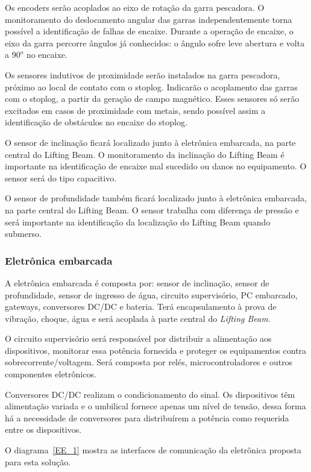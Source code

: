 Os encoders serão acoplados ao eixo de rotação da garra pescadora. O
monitoramento do deslocamento angular das garras independentemente torna
possível a identificação de falhas de encaixe. Durante a operação de encaixe, o
eixo da garra percorre ângulos já conhecidos: o ângulo sofre leve abertura e
volta a $90^o$ no encaixe. 

Os sensores indutivos de proximidade serão instalados na garra pescadora,
próximo ao local de contato com o stoplog. Indicarão o acoplamento das garras
com o stoplog, a partir da geração de campo magnético. Esses sensores só serão
excitados em casos de proximidade com metais, sendo possível assim a
identificação de obstáculos no encaixe do stoplog. 

O sensor de inclinação ficará localizado junto à eletrônica embarcada, na parte
central do Lifting Beam. O monitoramento da inclinação do Lifting Beam é
importante na identificação de encaixe mal sucedido ou danos no equipamento. O
sensor será do tipo capacitivo.

O sensor de profundidade também ficará localizado junto à eletrônica embarcada,
na parte central do Lifting Beam. O sensor trabalha com diferença de pressão e
será importante na identificação da localização do Lifting Beam quando submerso.

\subsubsection{Eletrônica embarcada}
A eletrônica embarcada é composta por: sensor de inclinação, sensor de
profundidade, sensor de ingresso de água, circuito supervisório, PC embarcado,
gateways, conversores DC/DC e bateria. Terá encapsulamento à prova de vibração,
choque, água e será acoplada à parte central do \emph{Lifting Beam}.

O circuito supervisório será responsável por distribuir a alimentação aos
dispositivos, monitorar essa potência fornecida e proteger os equipamentos
contra sobrecorrente/voltagem. Será composta por relés, microcontroladores e
outros componentes eletrônicos.

Conversores DC/DC realizam o condicionamento do sinal. Os dispositivos têm
alimentação variada e o umbilical fornece apenas um nível de tensão, dessa forma
há a necessidade de conversores para distribuírem a potência como requerida
entre os dispositivos.

O diagrama~\ref{EE_1} mostra as interfaces de comunicação da eletrônica proposta
para esta solução.

